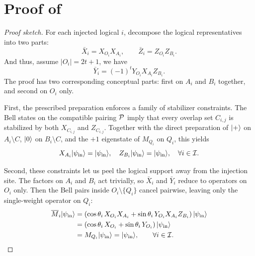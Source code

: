 \section{Proof of }
\label{sec:proof-all-in-one}

\begin{proof}[Proof sketch]
    For each injected logical $i$, decompose the logical representatives into two parts:
    \[
    \bar X_i = X_{O_i}X_{A_i},
    \qquad
    \bar Z_i = Z_{O_i}Z_{B_i}.
    \]
    And thus, assume $ |O_i| = 2t+1 $, we have
    \[
    \bar Y_i = (-1)^t Y_{O_i}X_{A_i}Z_{B_i}.
    \]
    The proof has two corresponding conceptual parts: first on $ A_i $ and $ B_i $ together, and second on $ O_i $ only.
    
    First, the prescribed preparation enforces a family of stabilizer constraints.
    The Bell states on the compatible pairing $\mathcal{P}$ imply that every overlap set
    $C_{i,j}$ is stabilized by both $X_{C_{i,j}}$ and $Z_{C_{i,j}}$.
    Together with the direct preparation of $\ket{+}$ on $A_i\setminus C$,
    $\ket{0}$ on $B_i\setminus C$, and the $+1$ eigenstate of $M_{Q_i}$ on $Q_i$,
    this yields
    \begin{equation}
    X_{A_i}|\psi_{\mathrm{in}}\rangle = |\psi_{\mathrm{in}}\rangle, \quad
    Z_{B_i}|\psi_{\mathrm{in}}\rangle = |\psi_{\mathrm{in}}\rangle, \quad
    \forall i\in\mathcal{I}.
    \label{eq:multi-prep-generic}
    \end{equation}

    Second, these constraints let us peel the logical support away from the
    injection site.
    The factors on $A_i$ and $B_i$ act trivially, so $\bar X_i$ and $\bar Y_i$
    reduce to operators on $O_i$ only.
    Then the Bell pairs inside $O_i\setminus\{Q_i\}$ cancel pairwise, leaving only
    the single-weight operator on $Q_i$:
    \begin{equation}
    \begin{aligned}
    \overline{M}_i|\psi_{\mathrm{in}}\rangle 
    &= \left(\cos\theta_i\,X_{O_i} X_{A_i} + \sin\theta_i\,Y_{O_i} X_{A_i} Z_{B_i}\right) |\psi_{\mathrm{in}}\rangle \\
    &= \left(\cos\theta_i\,X_{O_i} + \sin\theta_i\,Y_{O_i}\right) |\psi_{\mathrm{in}}\rangle \\
    &= M_{Q_i}|\psi_{\mathrm{in}}\rangle = |\psi_{\mathrm{in}}\rangle,
    \qquad \forall i\in\mathcal{I}.
    \end{aligned}
    \label{eq:M-reduce-to-Qi-app}
    \end{equation}
\end{proof}

